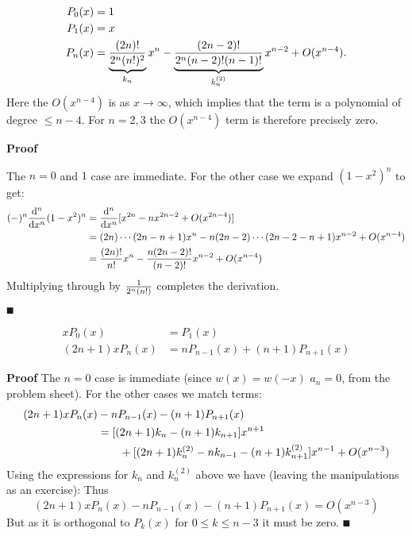 \begin{lemma}
\begin{align*}
P_0(x) &= 1 \\
P_1(x) &= x \\
P_n(x) &= \underbrace{{(2n)! \over 2^n (n!)^2}}_{k_n} x^n - \underbrace{(2n-2)! \over 2^n (n-2)! (n-1)!}_{k_n^{(2)}} x^{n-2} + O(x^{n-4}).
\end{align*}
Here the $O(x^{n-4})$ is as $x \ensuremath{\rightarrow} \ensuremath{\infty}$, which implies that the term is a polynomial of degree $\ensuremath{\leq} n-4$. For $n = 2,3$ the $O(x^{n-4})$ term is therefore precisely zero.

\end{lemma}
\textbf{Proof}

The $n=0$ and $1$ case are immediate. For the other case we expand $(1-x^2)^n$ to get:
\begin{align*}
(-)^n {{\rm d}^n \over {\rm d} x^n} (1-x^2)^n &=
{{\rm d}^n \over {\rm d} x^n} [ x^{2n} - n x^{2n-2} + O(x^{2n-4})]\\
&= (2n)\ensuremath{\cdots}(2n-n+1) x^n - n (2n-2)\ensuremath{\cdots}(2n-2-n+1) x^{n-2} + O(x^{n-4}) \\
&= {(2n)! \over n!} x^n - {n (2n-2)! \over (n-2)!} x^{n-2} + O(x^{n-4})
\end{align*}
Multiplying through by ${1 \over 2^n (n!)}$ completes the derivation.

\ensuremath{\QED}

\begin{theorem}
\begin{align*}
xP_0(x) &= P_1(x) \\
(2n+1) xP_n(x) &= nP_{n-1}(x) + (n+1)P_{n+1}(x)
\end{align*}
\end{theorem}
\textbf{Proof} The $n = 0$ case is immediate (since $w(x) = w(-x)$ $a_n = 0$, from the problem sheet). For the other cases we match terms:
\begin{align*}
(2n+1)xP_n(x) &- n P_{n-1}(x) - (n+1)P_{n+1}(x) \ccr
 = [(2n+1)k_n - (n+1) k_{n+1}] x^{n+1} \cr
 &\qquad  + [(2n+1) k_n^{(2)} -n k_{n-1} - (n+1) k_{n+1}^{(2)}] x^{n-1} + O(x^{n-3})
\end{align*}
Using the expressions for $k_n$ and $k_n^{(2)}$ above we have (leaving the manipulations as an exercise):
Thus
\[
(2n+1)xP_n(x) - n P_{n-1}(x) - (n+1)P_{n+1}(x) = O(x^{n-3})
\]
But as it is orthogonal to $P_k(x)$ for $0 \ensuremath{\leq} k \ensuremath{\leq} n-3$ it must be zero. \ensuremath{\QED}



